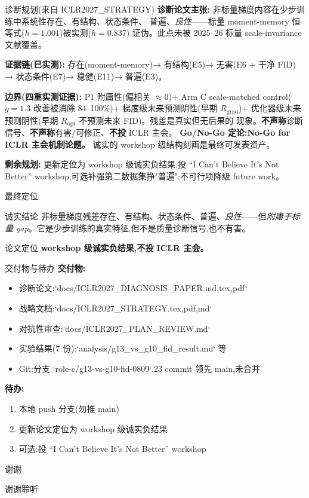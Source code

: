\documentclass[UTF8,aspectratio=169]{ctexbeamer}
\begin{document}
\begin{frame}{诊断规划(来自 ICLR2027\_STRATEGY)}
\textbf{诊断论文主张:} 非标量梯度内容在少步训练中系统性存在、有结构、状态条件、
普遍、\emph{良性}——标量 moment-memory 恒等式($h{=}1.001$)被实测($h{=}0.837$)
证伪。此点未被 2025--26 标量 scale-invariance 文献覆盖。

\textbf{证据链(已实测):} 存在(moment-memory)→ 有结构(E5)→ 无害(E6 + 干净 FID)
→ 状态条件(E7)→ 稳健(E11)→ 普遍(E3)。

\textbf{边界(四重实测证据):} P1 附庸性(偏相关 $\approx 0$)+ Arm C scale-matched
control($g{=}1.3$ 改善被消除 84--100\%)+ 梯度级未来预测阴性(早期 $R_{\mathrm{grad}}$)+
优化器级未来预测阴性(早期 $R_{\mathrm{opt}}$ 不预测未来 FID)。残差是真实但无后果的
现象。\textbf{不声称}诊断信号、\textbf{不声称}有害/可修正、\textbf{不投} ICLR 主会。
\textbf{Go/No-Go 定论:No-Go for ICLR 主会机制论题。} 诚实的 workshop 级结构刻画是最终可发表资产。

\textbf{剩余规划:} 更新定位为 workshop 级诚实负结果;投 ``I Can't Believe It's
Not Better'' workshop;可选补强第二数据集挣"普遍";不可行项降级 future work。
\end{frame}

\begin{frame}{最终定位}
\begin{block}{诚实结论}
非标量梯度残差存在、有结构、状态条件、普遍、\emph{良性}——但\emph{附庸于标量
gap}。它是少步训练的真实特征,但不是质量诊断信号,也不有害。
\end{block}
\begin{alertblock}{论文定位}
\textbf{workshop 级诚实负结果,不投 ICLR 主会。}
\end{alertblock}
\end{frame}

\begin{frame}{交付物与待办}
\textbf{交付物:}
\begin{itemize}
  \item 诊断论文:`docs/ICLR2027\_DIAGNOSIS\_PAPER.{md,tex,pdf}`
  \item 战略文档:`docs/ICLR2027\_STRATEGY.{tex,pdf,md}`
  \item 对抗性审查:`docs/ICLR2027\_PLAN\_REVIEW.md`
  \item 实验结果(7 份):`analysis/g13\_vs\_g10\_fid\_result.md` 等
  \item Git:分支 `role-c/g13-vs-g10-fid-0809`,23 commit 领先 main,未合并
\end{itemize}
\textbf{待办:}
\begin{enumerate}
  \item 本地 push 分支(勿推 main)
  \item 更新论文定位为 workshop 级诚实负结果
  \item 可选:投 ``I Can't Believe It's Not Better'' workshop
\end{enumerate}
\end{frame}

\begin{frame}{谢谢}
\begin{center}
\Large 谢谢聆听
\end{center}
\end{frame}
\end{document}
